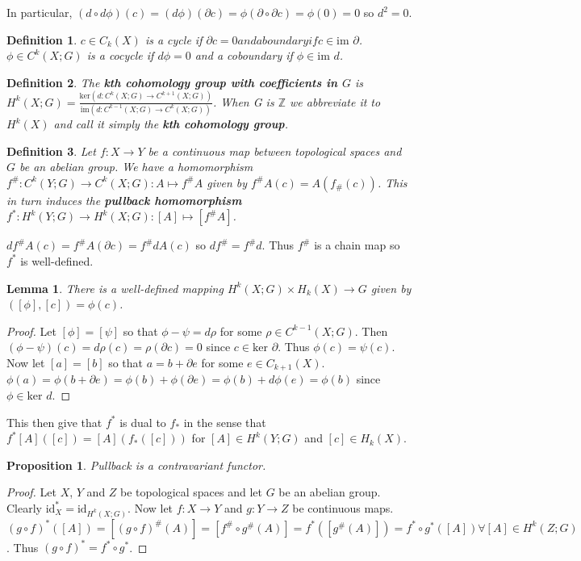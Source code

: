 \documentclass{report}
\newtheorem{definition}{Definition}
\newtheorem{lemma}{Lemma}
\newtheorem{proposition}{Proposition}
\begin{document}
\noindent In particular, $(d\circ d\phi)(c)=(d\phi)(\partial c)=\phi(\partial\circ\partial c)=\phi(0)=0$ so $d^2=0$.

\begin{definition}
$c\in C_k(X)$ is a cycle if $\partial c=0 and a boundary if c\in\text{im }\partial$.
$\phi\in C^k(X;G)$ is a cocycle if $d\phi=0$ and a coboundary if $\phi\in\text{im }d$.
\end{definition}

\begin{definition}
The \textbf{kth cohomology group with coefficients in $G$} is $H^k(X;G)=\frac{\text{ker}(d\colon C^k(X;G)\to C^{k+1}(X;G))}{\text{im}(d\colon C^{k-1}(X;G)\to C^k(X;G))}$. When G is $\mathbb{Z}$ we abbreviate it to $H^k(X)$ and call it simply the \textbf{kth cohomology group}.
\end{definition}

\begin{definition}
Let $f\colon X\to Y$ be a continuous map between topological spaces and $G$ be an abelian group. We have a homomorphism $f^\#\colon C^k(Y;G)\to C^k(X;G):A\mapsto f^\# A$ given by $f^\# A(c)=A(f_\#(c))$. This in turn induces the \textbf{pullback homomorphism} $f^*\colon H^k(Y;G)\to H^k(X;G):[A]\mapsto [f^\# A]$.
\end{definition}
\noindent $df^\# A(c)=f^\# A(\partial c)=f^\# dA(c)$ so $df^\#=f^\# d$. Thus $f^\#$ is a chain map so $f^*$ is well-defined.

\begin{lemma}
There is a well-defined mapping $H^k(X;G)\times H_k(X)\to G$ given by $([\phi],[c])=\phi(c)$.
\end{lemma}
\begin{proof}
Let $[\phi]=[\psi]$ so that $\phi-\psi=d\rho$ for some $\rho\in C^{k-1}(X;G)$. Then $(\phi-\psi)(c)=d\rho(c)=\rho(\partial c)=0$ since $c\in\text{ker }\partial$. Thus $\phi(c)=\psi(c)$.
Now let $[a]=[b]$ so that $a=b+\partial e$ for some $e\in C_{k+1}(X)$. $\phi(a)=\phi(b+\partial e)=\phi(b)+\phi(\partial e)=\phi(b)+d\phi(e)=\phi(b)$ since $\phi\in\text{ker }d$.
\end{proof}

\noindent This then give that $f^*$ is dual to $f_*$ in the sense that $f^*[A]([c])=[A](f_*([c]))$ for $[A]\in H^k(Y;G)$ and $[c]\in H_k(X)$.

\begin{proposition}
Pullback is a contravariant functor.
\end{proposition}
\begin{proof}
Let $X$, $Y$ and $Z$ be topological spaces and let $G$ be an abelian group. 
Clearly $\text{id}_X^*=\text{id}_{H^k(X;G)}$.
Now let $f\colon X\to Y$ and $g\colon Y\to Z$ be continuous maps. $(g\circ f)^*([A])=[(g\circ f)^\#(A)]=[f^\#\circ g^\#(A)]=f^*([g^\#(A)])=f^*\circ g^*([A])\forall [A]\in H^k(Z;G)$. Thus $(g\circ f)^*=f^*\circ g^*$.
\end{proof}
\end{document}
